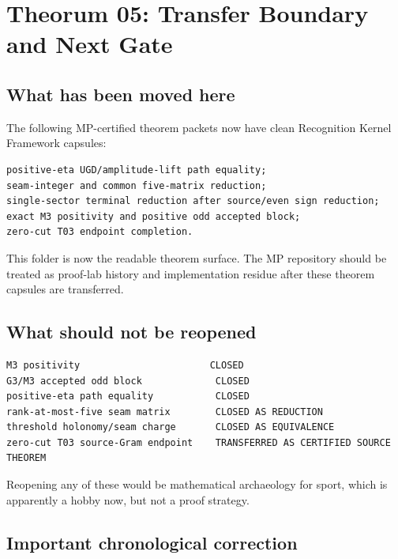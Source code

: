 \hypertarget{theorum-05-transfer-boundary-and-next-gate}{%
\chapter{Theorum 05: Transfer Boundary and Next Gate}\label{theorum-05-transfer-boundary-and-next-gate}}

\hypertarget{what-has-been-moved-here}{%
\section{What has been moved here}\label{what-has-been-moved-here}}

The following MP-certified theorem packets now have clean Recognition Kernel Framework capsules:

\begin{verbatim}
positive-eta UGD/amplitude-lift path equality;
seam-integer and common five-matrix reduction;
single-sector terminal reduction after source/even sign reduction;
exact M3 positivity and positive odd accepted block;
zero-cut T03 endpoint completion.
\end{verbatim}

This folder is now the readable theorem surface. The MP repository should be treated as proof-lab history and implementation residue after these theorem capsules are transferred.

\hypertarget{what-should-not-be-reopened}{%
\section{What should not be reopened}\label{what-should-not-be-reopened}}

\begin{verbatim}
M3 positivity                       CLOSED
G3/M3 accepted odd block             CLOSED
positive-eta path equality           CLOSED
rank-at-most-five seam matrix        CLOSED AS REDUCTION
threshold holonomy/seam charge       CLOSED AS EQUIVALENCE
zero-cut T03 source-Gram endpoint    TRANSFERRED AS CERTIFIED SOURCE THEOREM
\end{verbatim}

Reopening any of these would be mathematical archaeology for sport, which is apparently a hobby now, but not a proof strategy.

\hypertarget{important-chronological-correction}{%
\section{Important chronological correction}\label{important-chronological-correction}}

